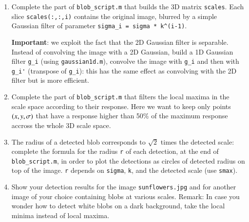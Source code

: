 \begin{enumerate}
\begin{enumerate}
  \item {} Complete the part of \verb!blob_script.m! that builds the 3D matrix \verb!scales!. Each slice \verb!scales(:,:,i)! contains the original image, blurred by a simple Gaussian filter of parameter \verb!sigma_i = sigma * k^(i-1)!. 

    \textbf{Important}: we exploit the fact that the 2D Gaussian filter is separable. Instead of convolving the image with a 2D Gaussian, build a 1D Gaussian filter \verb!g_i! (using \verb!gaussian1d.m!), convolve the image with \verb!g_i! and then with \verb!g_i'! (transpose of \verb!g_i!): this has the same effect as convolving with the 2D filter but is more efficient.
  \item {} Complete the part of \verb!blob_script.m! that filters the local maxima in the scale space according to their response. Here we want to keep only points $(x,y,\sigma)$ that have a response higher than 50\% of the maximum response accross the whole 3D scale space.
  \item {} The radius of a detected blob corresponds to $\sqrt{2}$ times the detected scale: complete the formula for the radius \verb!r! of each detection, at the end of \verb!blob_script.m!, in order to plot the detections as circles of detected radius on top of the image. \verb!r! depends on \verb!sigma!, \verb!k!, and the detected scale (use \verb!smax!).
  \item {} Show your detection results for the image \verb!sunflowers.jpg! and for another image of your choice containing blobs at various scales. Remark: In case you wonder how to detect white blobs on a dark background, take the local minima instead of local maxima.
  \end{enumerate}
  
\end{enumerate}



